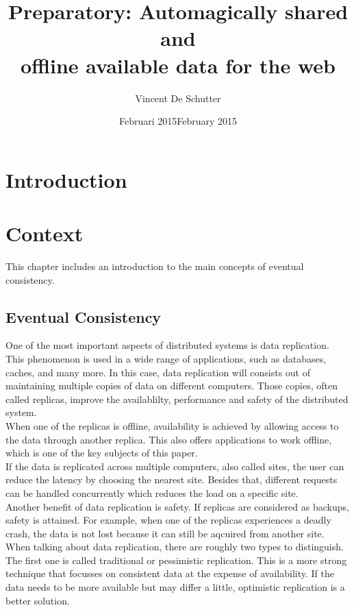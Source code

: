 \documentclass[a4paper,12pt]{report}
\author{Vincent De Schutter}
\title{Preparatory: Automagically shared and \\offline available data for the web}
\date{Februari 2015}
\begin{document}
\maketitlepage


\date{February 2015}

\maketitlepage

\tableofcontents
\newpage

\chapter{Introduction}\label{cha:Introduction} %
\chapter{Context}\label{cha:Context} %

This chapter includes an introduction to the main concepts of eventual consistency. 

\section{Eventual Consistency}\label{sec:EventualConsistency}

One of the most important aspects of distributed systems is data replication. This phenomenon is used in a wide range of applications, such as databases, caches, and many more. In this case, data replication will consists out of maintaining multiple copies of data on different computers. Those copies, often called replicas, improve the availablilty, performance and safety of the distributed system. \\
When one of the replicas is offline, availability is achieved by allowing access to the data through another replica. This also offers applications to work offline, which is one of the key subjects of this paper. \\
If the data is replicated across multiple computers, also called sites, the user can reduce the latency by choosing the nearest site. Besides that, different requests can be handled concurrently which reduces the load on a specific site. \\
Another benefit of data replication is safety. If replicas are considered as backups, safety is attained. For example, when one of the replicas experiences a deadly crash, the data is not lost because it can still be aqcuired from another site.\\
\newline
When talking about data replication, there are roughly two types to distinguish. The first one is called traditional or pessimistic replication. This is a more strong technique that focusses on consistent data at the expense of availability. If the data needs to be more available but may differ a little, optimistic replication is a better solution.
\end{document}

